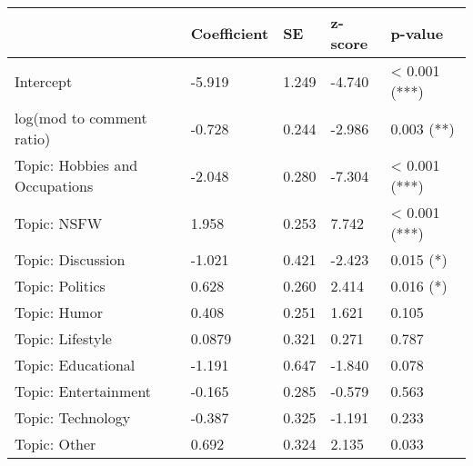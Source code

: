 



\begin{table}[tb]
\centering
{}
\begin{tabular}{lllll} 
\toprule
                               & \textbf{Coefficient} & \textbf{SE} & \textbf{z-score} & \textbf{p-value}  \\ 
\toprule
Intercept                      & -5.919               & 1.249       & -4.740           & < 0.001 (***)      \\
log(mod to comment ratio)      & -0.728               & 0.244       & -2.986           & 0.003 (**)        \\
Topic: Hobbies and Occupations & -2.048               & 0.280       & -7.304           & < 0.001 (***)      \\
Topic: NSFW                    & 1.958                & 0.253       & 7.742            & < 0.001 (***)      \\
Topic: Discussion              & -1.021               & 0.421       & -2.423           & 0.015 (*)         \\
Topic: Politics                & 0.628                & 0.260       & 2.414            & 0.016 (*)         \\
Topic: Humor                   & 0.408                & 0.251       & 1.621            & 0.105             \\
Topic: Lifestyle               & 0.0879               & 0.321       & 0.271            & 0.787             \\
Topic: Educational             & -1.191               & 0.647       & -1.840           & 0.078             \\
Topic: Entertainment           & -0.165               & 0.285       & -0.579           & 0.563             \\
Topic: Technology              & -0.387               & 0.325       & -1.191           & 0.233             \\
Topic: Other                   & 0.692                & 0.324       & 2.135            & 0.033             \\
\bottomrule
\end{tabular}
\end{table}

